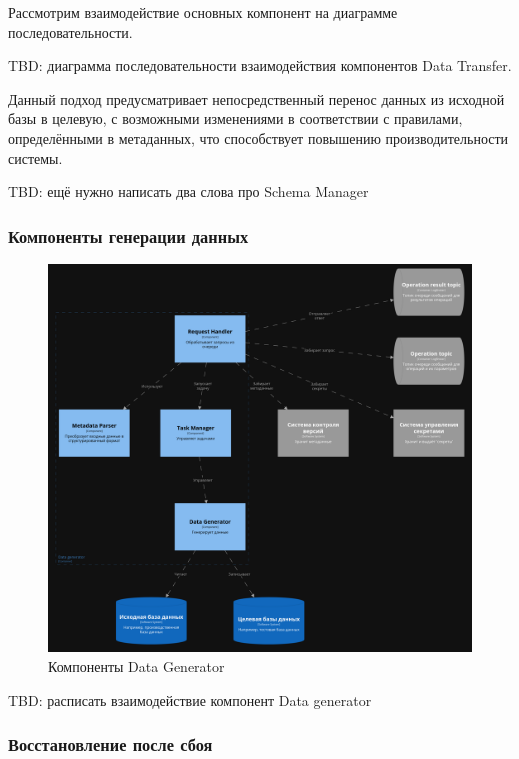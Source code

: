 Рассмотрим взаимодействие основных компонент на диаграмме последовательности.

TBD: диаграмма последовательности взаимодействия компонентов Data Transfer.

Данный подход предусматривает непосредственный перенос данных из исходной базы в целевую, с возможными изменениями в соответствии с правилами, определёнными в метаданных, что способствует повышению производительности системы.

TBD: ещё нужно написать два слова про Schema Manager

\subsubsection{Компоненты генерации данных}

\begin{figure}
  \includegraphics[scale=0.15]{./img/structurizr-DataGeneratorComponents.png}
  \caption{Компоненты Data Generator}
  \label{Data Generator Components}
\end{figure}

TBD: расписать взаимодействие компонент Data generator

\subsubsection{Восстановление после сбоя}

